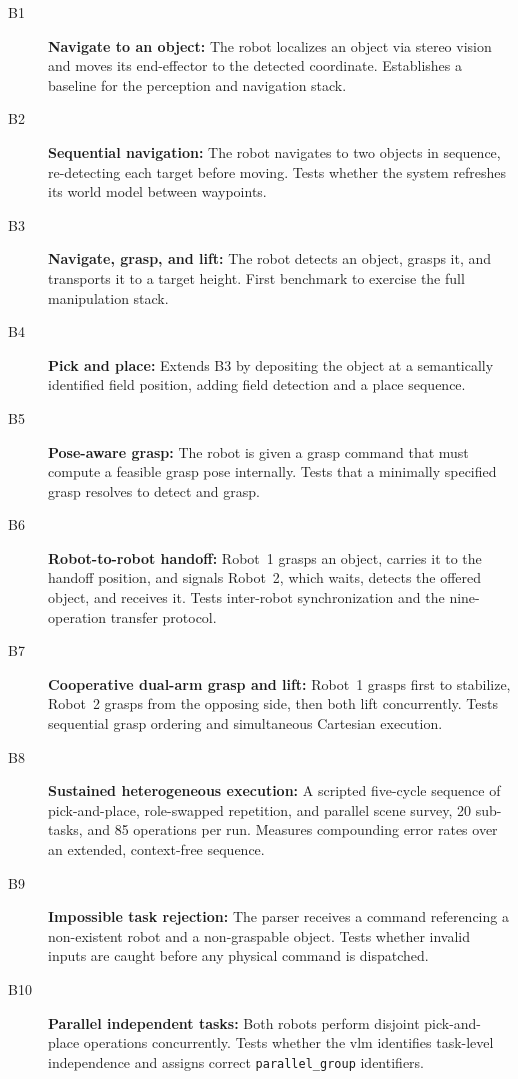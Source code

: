 \documentclass[
     12pt,
     a4paper,
     BCOR=10mm,
     DIV=14,
     listof=totoc,
     bibliography=totoc,
     parskip,
     twoside,
     headsepline
     ]{scrreprt}
\begin{document}
\begin{description}
	\item[B1] \textbf{Navigate to an object:} The robot localizes an object via stereo vision and moves its end-effector to the detected coordinate. Establishes a baseline for the perception and navigation stack.
	\item[B2] \textbf{Sequential navigation:} The robot navigates to two objects in sequence, re-detecting each target before moving. Tests whether the system refreshes its world model between waypoints.
	\item[B3] \textbf{Navigate, grasp, and lift:} The robot detects an object, grasps it, and transports it to a target height. First benchmark to exercise the full manipulation stack.
	\item[B4] \textbf{Pick and place:} Extends B3 by depositing the object at a semantically identified field position, adding field detection and a place sequence.
	\item[B5] \textbf{Pose-aware grasp:} The robot is given a grasp command that must compute a feasible grasp pose internally. Tests that a minimally specified grasp resolves to detect and grasp.
	\item[B6] \textbf{Robot-to-robot handoff:} Robot~1 grasps an object, carries it to the handoff position, and signals Robot~2, which waits, detects the offered object, and receives it. Tests inter-robot synchronization and the nine-operation transfer protocol.
	\item[B7] \textbf{Cooperative dual-arm grasp and lift:} Robot~1 grasps first to stabilize, Robot~2 grasps from the opposing side, then both lift concurrently. Tests sequential grasp ordering and simultaneous Cartesian execution.
	\item[B8] \textbf{Sustained heterogeneous execution:} A scripted five-cycle sequence of pick-and-place, role-swapped repetition, and parallel scene survey, 20 sub-tasks, and 85 operations per run. Measures compounding error rates over an extended, context-free sequence.
	\item[B9] \textbf{Impossible task rejection:} The parser receives a command referencing a non-existent robot and a non-graspable object. Tests whether invalid inputs are caught before any physical command is dispatched.
	\item[B10] \textbf{Parallel independent tasks:} Both robots perform disjoint pick-and-place operations concurrently. Tests whether the \gls{vlm} identifies task-level independence and assigns correct \texttt{parallel\_group} identifiers.

\end{description}
\end{document}
